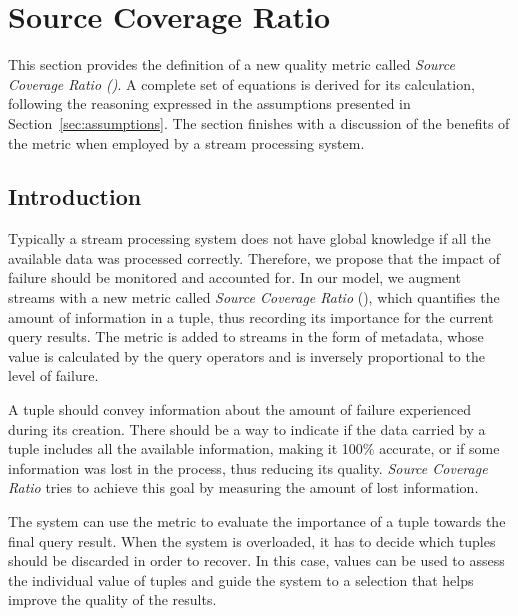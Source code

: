 \section{Source Coverage Ratio}
\label{sec:sic}


This section provides the definition of a new quality metric called \emph{Source Coverage Ratio
(\sic)}. A complete set of equations is derived for
its calculation, following the reasoning expressed in the assumptions presented in
Section~\ref{sec:assumptions}. The section finishes with a discussion of the benefits of the \sic metric
when employed by a stream processing system.

\subsection*{Introduction}

Typically a stream processing system does not have global knowledge if all the
available data was processed correctly. 
Therefore, we propose that the impact of failure should be monitored and accounted for. 
In our model, we augment streams with a new metric called \textit{Source Coverage Ratio}
(\sic), which quantifies the amount of information in a tuple, thus recording its
importance for the current query results. The \sic metric is added to streams in the form of metadata,
whose value is calculated by the query operators and is inversely proportional to the level of failure.

A tuple should convey information about the amount of failure experienced during its creation. There
should be a way to indicate if the data carried by a tuple includes all the available
information, making it 100\% accurate, or if some information was lost in the process, thus reducing
its quality. \textit{Source Coverage Ratio} tries to achieve
this goal by measuring the amount of lost information.

The system can use the \sic metric to evaluate the importance of a tuple towards the final query result. 
When the system is overloaded, it has to decide which tuples should
be discarded in order to recover. In this case, \sic values can be used to assess the
individual value of tuples and guide the system to a selection that helps improve the quality of the
results.

